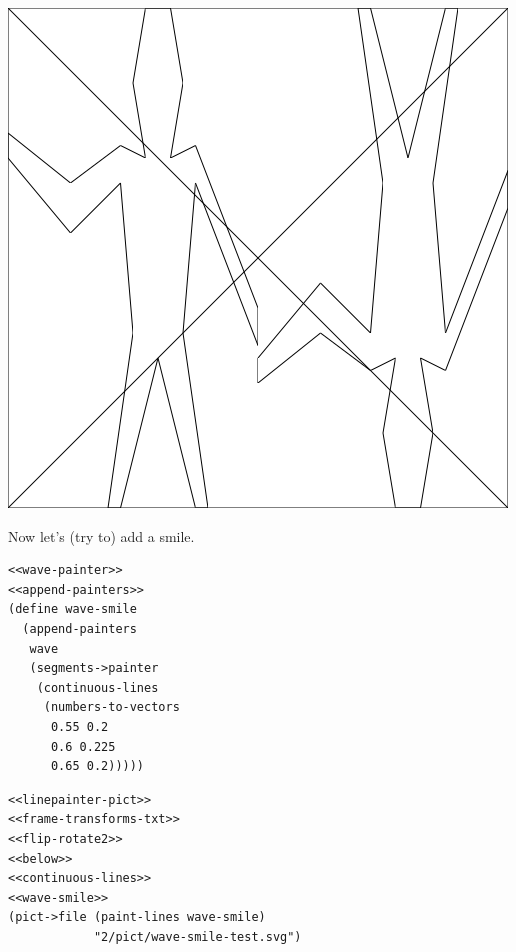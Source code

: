 \documentclass[final,fleqn,titlepage,twoside]{article}
\begin{document}
\begin{center}
\includegraphics[width=.9\linewidth]{2/pict/append-test.png}
\end{center}

Now let's (try to) add a smile.

\begin{verbatim}
<<wave-painter>>
<<append-painters>>
(define wave-smile
  (append-painters
   wave
   (segments->painter
    (continuous-lines
     (numbers-to-vectors
      0.55 0.2
      0.6 0.225
      0.65 0.2)))))
\end{verbatim}
\begin{verbatim}
<<linepainter-pict>>
<<frame-transforms-txt>>
<<flip-rotate2>>
<<below>>
<<continuous-lines>>
<<wave-smile>>
(pict->file (paint-lines wave-smile)
            "2/pict/wave-smile-test.svg")
\end{verbatim}
\end{document}
